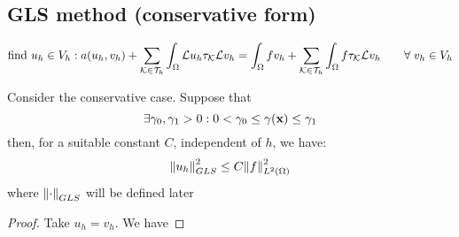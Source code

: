 \subsection{GLS method (conservative form)}
\[
    \text{find }u_h \in V_h : a(u_h, v_h) + \sum_{\mathcal{K} \in \mathcal{T}_h} \int_\Omega \mathcal{L}u_h \tau_{\mathcal{K}} \mathcal{L}v_h = \int_\Omega f v_h + \sum_{\mathcal{K} \in \mathcal{T}_h} \int_\Omega f \tau_{\mathcal{K}} \mathcal{L}v_h \qquad \forall \; v_h \in V_h
\]
\begin{theorem}
    Consider the conservative case. Suppose that 
    \[
        \exists \gamma_0 , \gamma_1 > 0 : 0 < \gamma_0 \leq \gamma(\textbf{x}) \leq \gamma_1
    \]
    then, for a suitable constant \(C\), independent of \(h\), we have:
    \[
        \norm{u_h}_{GLS}^2 \leq C \norm{f}_{L^2(\Omega)}^2
    \]
    where \(\norm{\cdot}_{GLS}\) will be defined later
\end{theorem}
\begin{proof}
    Take \(u_h = v_h\). We have 
\end{proof}